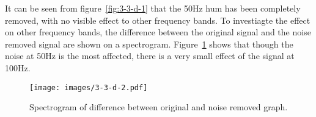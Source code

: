\documentclass[main.tex]{subfiles}
\begin{document}
It can be seen from figure~\ref{fig:3-3-d-1} that the 50Hz hum has been completely removed, with no visible effect to other frequency bands. To investiagte the effect on other frequency bands, the difference between the original signal and the noise removed signal are shown on a spectrogram. Figure~\ref{fig:3-3-d-2} shows that though the noise at 50Hz is the most affected, there is a very small effect of the signal at 100Hz.

\begin{figure}[H]
	\centering
	\texttt{[image: images/3-3-d-2.pdf]}
	\caption{Spectrogram of difference between original and noise removed graph.}
	\label{fig:3-3-d-2}
\end{figure}



\end{document}
